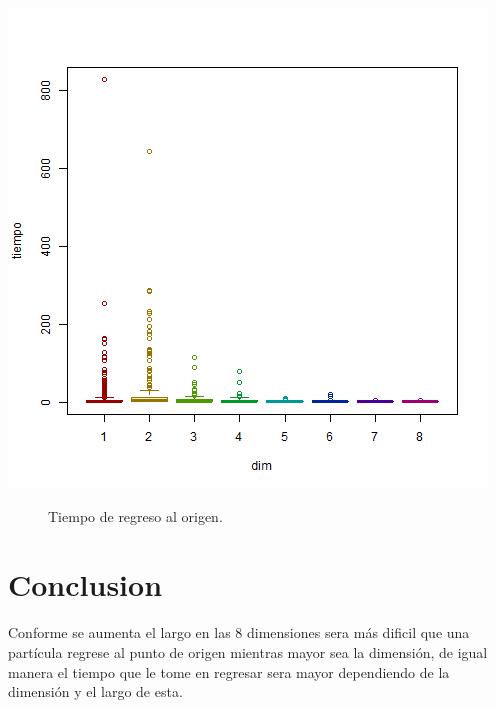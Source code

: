 \documentclass{article}
\begin{document}
\cite{yo}
\centering
\includegraphics[scale=0.7]
{demo.png}
\begin{figure}\caption{Tiempo de regreso al origen.}
\end{figure}

\newpage

\section{Conclusion}\label{con}

Conforme se aumenta el largo en las 8 dimensiones sera m\'as dificil que una part\'icula regrese al punto de origen mientras mayor sea la dimensi\'on, de igual manera el tiempo que le tome en regresar sera mayor dependiendo de la dimensi\'on y el largo de esta.



\end{document}
